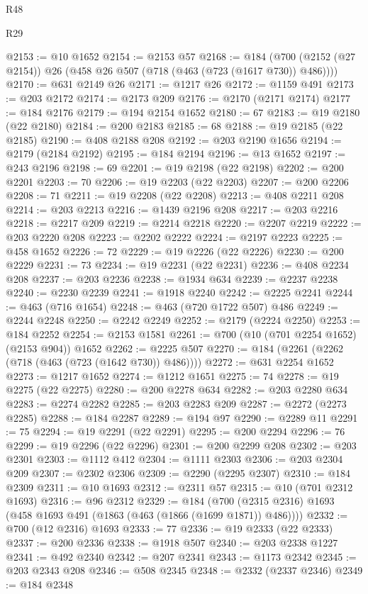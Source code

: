 \begin{lexlean}{R48}
\begin{lexlean}{R29}
\begin{coremodule}
{{{{{{{{{{{{{{{{{{{{{{{{{{{{{{{{{{{{{{{{{{{{{{{{{{{{{{{{{{{{{{{{{{{{{{{{{{{{{{{{{{{{{{{{{{{{{{{{{{{{{{{{{{{{{{{{{{{{{{{{{{{{{{{{{{{{{{{{{{{{{{{{{{{{{{{{{{{{{{{{{{{{{{{{{{{{{{{{{{{{{{{{{{{{{{{{{{{{{{{{{{{{{{{{{{{{{{{{{{@2153 := @10 @1652
@2154 := @2153 @57
@2168 := @184 (@700 (@2152 (@27 @2154)) @26 (@458 @26 @507 (@718 (@463 (@723 (@1617 @730)) @486))))
@2170 := @631 @2149 @26
@2171 := @1217 @26
@2172 := @1159 @491
@2173 := @203 @2172
@2174 := @2173 @209
@2176 := @2170 (@2171 @2174)
@2177 := @184 @2176
@2179 := @194 @2154 @1652
@2180 := 67
@2183 := @19 @2180 (@22 @2180)
@2184 := @200 @2183
@2185 := 68
@2188 := @19 @2185 (@22 @2185)
@2190 := @408 @2188 @208
@2192 := @203 @2190 @1656
@2194 := @2179 (@2184 @2192)
@2195 := @184 @2194
@2196 := @13 @1652
@2197 := @243 @2196
@2198 := 69
@2201 := @19 @2198 (@22 @2198)
@2202 := @200 @2201
@2203 := 70
@2206 := @19 @2203 (@22 @2203)
@2207 := @200 @2206
@2208 := 71
@2211 := @19 @2208 (@22 @2208)
@2213 := @408 @2211 @208
@2214 := @203 @2213
@2216 := @1439 @2196 @208
@2217 := @203 @2216
@2218 := @2217 @209
@2219 := @2214 @2218
@2220 := @2207 @2219
@2222 := @203 @2220 @208
@2223 := @2202 @2222
@2224 := @2197 @2223
@2225 := @458 @1652
@2226 := 72
@2229 := @19 @2226 (@22 @2226)
@2230 := @200 @2229
@2231 := 73
@2234 := @19 @2231 (@22 @2231)
@2236 := @408 @2234 @208
@2237 := @203 @2236
@2238 := @1934 @634
@2239 := @2237 @2238
@2240 := @2230 @2239
@2241 := @1918 @2240
@2242 := @2225 @2241
@2244 := @463 (@716 @1654)
@2248 := @463 (@720 @1722 @507) @486
@2249 := @2244 @2248
@2250 := @2242 @2249
@2252 := @2179 (@2224 @2250)
@2253 := @184 @2252
@2254 := @2153 @1581
@2261 := @700 (@10 (@701 @2254 @1652) (@2153 @904)) @1652
@2262 := @2225 @507
@2270 := @184 (@2261 (@2262 (@718 (@463 (@723 (@1642 @730)) @486))))
@2272 := @631 @2254 @1652
@2273 := @1217 @1652
@2274 := @1212 @1651
@2275 := 74
@2278 := @19 @2275 (@22 @2275)
@2280 := @200 @2278 @634
@2282 := @203 @2280 @634
@2283 := @2274 @2282
@2285 := @203 @2283 @209
@2287 := @2272 (@2273 @2285)
@2288 := @184 @2287
@2289 := @194 @97
@2290 := @2289 @11
@2291 := 75
@2294 := @19 @2291 (@22 @2291)
@2295 := @200 @2294
@2296 := 76
@2299 := @19 @2296 (@22 @2296)
@2301 := @200 @2299 @208
@2302 := @203 @2301
@2303 := @1112 @412
@2304 := @1111 @2303
@2306 := @203 @2304 @209
@2307 := @2302 @2306
@2309 := @2290 (@2295 @2307)
@2310 := @184 @2309
@2311 := @10 @1693
@2312 := @2311 @57
@2315 := @10 (@701 @2312 @1693)
@2316 := @96 @2312
@2329 := @184 (@700 (@2315 @2316) @1693 (@458 @1693 @491 (@1863 (@463 (@1866 (@1699 @1871)) @486))))
@2332 := @700 (@12 @2316) @1693
@2333 := 77
@2336 := @19 @2333 (@22 @2333)
@2337 := @200 @2336
@2338 := @1918 @507
@2340 := @203 @2338 @1227
@2341 := @492 @2340
@2342 := @207 @2341
@2343 := @1173 @2342
@2345 := @203 @2343 @208
@2346 := @508 @2345
@2348 := @2332 (@2337 @2346)
@2349 := @184 @2348
}}}}}}}}}}}}}}}}}}}}}}}}}}}}}}}}}}}}}}}}}}}}}}}}}}}}}}}}}}}}}}}}}}}}}}}}}}}}}}}}}}}}}}}}}}}}}}}}}}}}}}}}}}}}}}}}}}}}}}}}}}}}}}}}}}}}}}}}}}}}}}}}}}}}}}}}}}}}}}}}}}}}}}}}}}}}}}}}}}}}}}}}}}}}}}}}}}}}}}}}}}}}}}}}}}}}}}}}}}
\end{coremodule}
\end{lexlean}
\end{lexlean}
